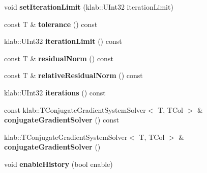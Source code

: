 \begin{DoxyCompactItemize}
\item 
void {\bfseries set\+Iteration\+Limit} (klab\+::\+U\+Int32 iteration\+Limit)\hypertarget{classkl1p_1_1TSubspacePursuitSolver_ac62875574d42d5674479155ca4f09f39}{}\label{classkl1p_1_1TSubspacePursuitSolver_ac62875574d42d5674479155ca4f09f39}

\item 
const T \& {\bfseries tolerance} () const \hypertarget{classkl1p_1_1TSubspacePursuitSolver_a09b638e425fa7a6818a566adb0550233}{}\label{classkl1p_1_1TSubspacePursuitSolver_a09b638e425fa7a6818a566adb0550233}

\item 
klab\+::\+U\+Int32 {\bfseries iteration\+Limit} () const \hypertarget{classkl1p_1_1TSubspacePursuitSolver_a011af752f52fd77783376da70fff9aab}{}\label{classkl1p_1_1TSubspacePursuitSolver_a011af752f52fd77783376da70fff9aab}

\item 
const T \& {\bfseries residual\+Norm} () const \hypertarget{classkl1p_1_1TSubspacePursuitSolver_a2902f3b64309c4b0dd7a6d3b78305e77}{}\label{classkl1p_1_1TSubspacePursuitSolver_a2902f3b64309c4b0dd7a6d3b78305e77}

\item 
const T \& {\bfseries relative\+Residual\+Norm} () const \hypertarget{classkl1p_1_1TSubspacePursuitSolver_a5831ee7e7902c2e72d67dfcf9d6c3afb}{}\label{classkl1p_1_1TSubspacePursuitSolver_a5831ee7e7902c2e72d67dfcf9d6c3afb}

\item 
klab\+::\+U\+Int32 {\bfseries iterations} () const \hypertarget{classkl1p_1_1TSubspacePursuitSolver_a3b92b21bea68301f9031f7628c88a986}{}\label{classkl1p_1_1TSubspacePursuitSolver_a3b92b21bea68301f9031f7628c88a986}

\item 
const klab\+::\+T\+Conjugate\+Gradient\+System\+Solver$<$ T, T\+Col $>$ \& {\bfseries conjugate\+Gradient\+Solver} () const \hypertarget{classkl1p_1_1TSubspacePursuitSolver_a3b458dd6bcf038be6b5c7170d0d6df59}{}\label{classkl1p_1_1TSubspacePursuitSolver_a3b458dd6bcf038be6b5c7170d0d6df59}

\item 
klab\+::\+T\+Conjugate\+Gradient\+System\+Solver$<$ T, T\+Col $>$ \& {\bfseries conjugate\+Gradient\+Solver} ()\hypertarget{classkl1p_1_1TSubspacePursuitSolver_ade1954995487a6f53c47b9e9fc7e0ede}{}\label{classkl1p_1_1TSubspacePursuitSolver_ade1954995487a6f53c47b9e9fc7e0ede}

\item 
void {\bfseries enable\+History} (bool enable)\hypertarget{classkl1p_1_1TSubspacePursuitSolver_a17fd30f6411069975a77e52a48b37ce9}{}\label{classkl1p_1_1TSubspacePursuitSolver_a17fd30f6411069975a77e52a48b37ce9}


\end{DoxyCompactItemize}
